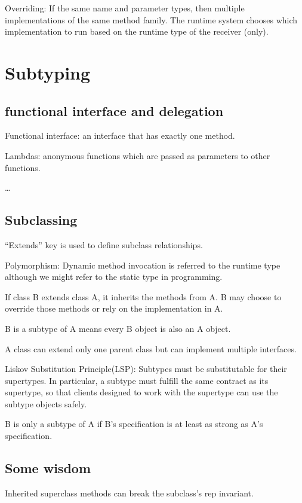 \documentclass[letterpaper,12pt]{article}
\begin{document}
Overriding: If the same name and parameter types, then multiple implementations of
the same method family. The runtime system chooses which implementation to run
based on the run\-time type of the receiver (only).

\section{Subtyping}

\subsection{functional interface and delegation}

Functional interface: an interface that has exactly one method.

Lambdas: anonymous functions which are passed as parameters to other functions.

\dots

\subsection{Subclassing}

``Extends'' key is used to define subclass relationships.

Polymorphism: Dynamic method invocation is referred to the runtime type
although we might refer to the static type in programming.

If class B extends class A, it inherits the methods from A. B may choose to
override those methods or rely on the implementation in A.

B is a subtype of A means every B object is also an A object.

A class can extend only one parent class but can implement multiple interfaces.

Liskov Substitution Principle(LSP): Subtypes must be substitutable for their
supertypes. In particular, a subtype must fulfill the same contract as its
supertype, so that clients designed to work with the supertype can use the
subtype objects safely.

B is only a subtype of A if B's specification is at least as strong as A's
specification.

\subsection{Some wisdom}
Inherited superclass methods can break the subclass's rep invariant.
\end{document}
